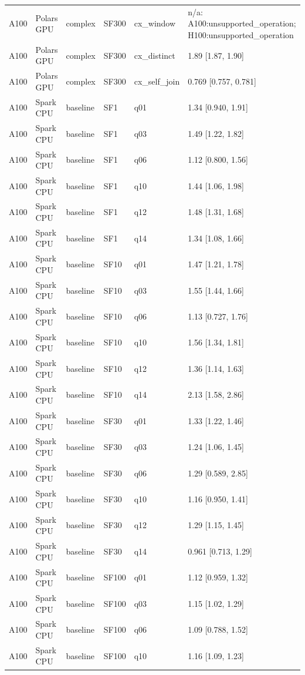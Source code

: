 \begin{longtable}{llllll}
A100 & Polars GPU & complex & SF300 & cx\_window & n/a: A100:unsupported\_operation; H100:unsupported\_operation \\
A100 & Polars GPU & complex & SF300 & cx\_distinct & 1.89 [1.87, 1.90] \\
A100 & Polars GPU & complex & SF300 & cx\_self\_join & 0.769 [0.757, 0.781] \\
A100 & Spark CPU & baseline & SF1 & q01 & 1.34 [0.940, 1.91] \\
A100 & Spark CPU & baseline & SF1 & q03 & 1.49 [1.22, 1.82] \\
A100 & Spark CPU & baseline & SF1 & q06 & 1.12 [0.800, 1.56] \\
A100 & Spark CPU & baseline & SF1 & q10 & 1.44 [1.06, 1.98] \\
A100 & Spark CPU & baseline & SF1 & q12 & 1.48 [1.31, 1.68] \\
A100 & Spark CPU & baseline & SF1 & q14 & 1.34 [1.08, 1.66] \\
A100 & Spark CPU & baseline & SF10 & q01 & 1.47 [1.21, 1.78] \\
A100 & Spark CPU & baseline & SF10 & q03 & 1.55 [1.44, 1.66] \\
A100 & Spark CPU & baseline & SF10 & q06 & 1.13 [0.727, 1.76] \\
A100 & Spark CPU & baseline & SF10 & q10 & 1.56 [1.34, 1.81] \\
A100 & Spark CPU & baseline & SF10 & q12 & 1.36 [1.14, 1.63] \\
A100 & Spark CPU & baseline & SF10 & q14 & 2.13 [1.58, 2.86] \\
A100 & Spark CPU & baseline & SF30 & q01 & 1.33 [1.22, 1.46] \\
A100 & Spark CPU & baseline & SF30 & q03 & 1.24 [1.06, 1.45] \\
A100 & Spark CPU & baseline & SF30 & q06 & 1.29 [0.589, 2.85] \\
A100 & Spark CPU & baseline & SF30 & q10 & 1.16 [0.950, 1.41] \\
A100 & Spark CPU & baseline & SF30 & q12 & 1.29 [1.15, 1.45] \\
A100 & Spark CPU & baseline & SF30 & q14 & 0.961 [0.713, 1.29] \\
A100 & Spark CPU & baseline & SF100 & q01 & 1.12 [0.959, 1.32] \\
A100 & Spark CPU & baseline & SF100 & q03 & 1.15 [1.02, 1.29] \\
A100 & Spark CPU & baseline & SF100 & q06 & 1.09 [0.788, 1.52] \\
A100 & Spark CPU & baseline & SF100 & q10 & 1.16 [1.09, 1.23] \\

\end{longtable}
